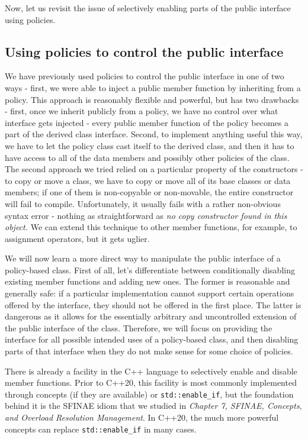 Now, let us revisit the issue of selectively enabling parts of the public interface using policies.

\subsection{Using policies to control the public interface}

We have previously used policies to control the public interface in one of two ways - first, we were able to inject a public member function by inheriting from a policy. This approach is reasonably flexible and powerful, but has two drawbacks - first, once we inherit publicly from a policy, we have no control over what interface gets injected - every public member function of the policy becomes a part of the derived class interface. Second, to implement anything useful this way, we have to let the policy class cast itself to the derived class, and then it has to have access to all of the data members and possibly other policies of the class. The second approach we tried relied on a particular property of the constructors - to copy or move a class, we have to copy or move all of its base classes or data members; if one of them is non-copyable or non-movable, the entire constructor will fail to compile. Unfortunately, it usually fails with a rather non-obvious syntax error - nothing as straightforward as \emph{no copy constructor found in this object.} We can extend this technique to other member functions, for example, to assignment operators, but it gets uglier.

We will now learn a more direct way to manipulate the public interface of a policy-based class. First of all, let's differentiate between conditionally disabling existing member functions and adding new ones. The former is reasonable and generally safe: if a particular implementation cannot support certain operations offered by the interface, they should not be offered in the first place. The latter is dangerous as it allows for the essentially arbitrary and uncontrolled extension of the public interface of the class. Therefore, we will focus on providing the interface for all possible intended uses of a policy-based class, and then disabling parts of that interface when they do not make sense for some choice of policies.

There is already a facility in the C++ language to selectively enable and disable member functions. Prior to C++20, this facility is most commonly implemented through concepts (if they are available) or \texttt{std::enable\_if}, but the foundation behind it is the SFINAE idiom that we studied in \emph{Chapter 7, SFINAE, Concepts, and Overload Resolution Management}. In C++20, the much more powerful concepts can replace \texttt{std::enable\_if} in many cases.

